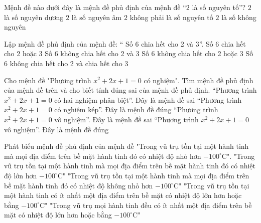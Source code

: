 \begin{ex}%
	Mệnh đề nào dưới đây là mệnh đề phủ định của mệnh đề “$2$ là số nguyên tố”?
	\choice
	{$2$ là số nguyên dương}
	{$2$ là số nguyên âm}
	{\True $2$ không phải là số nguyên tố}
	{$2$ là số không nguyên}
\end{ex}
\begin{ex}%
	Lập mệnh đề phủ định của mệnh đề: “ Số 6 chia hết cho 2 và 3”.
	\choice 
	{ Số 6 chia hết cho 2 hoặc 3} 
	{ Số 6 không chia hết cho 2 và 3} 
	{ \True Số 6 không chia hết cho 2 hoặc 3} 
	{ Số 6 không chia hết cho 2 và chia hết cho 3} 
\end{ex}
\begin{ex}%
	Cho mệnh đề "Phương trình  $x^2+2x+1=0$ có nghiệm". Tìm mệnh đề phủ định của mệnh đề trên và cho biết tính đúng sai của mệnh đề phủ định.
	\choice 
	{``Phương trình $x^2+2x+1=0$ có hai nghiệm phân biệt''. Đây là mệnh đề sai}
	{``Phương trình $x^2+2x+1=0$ có nghiệm kép''. Đây là mệnh đề đúng}
	{\True ``Phương trình $x^2+2x+1=0$ vô nghiệm''. Đây là mệnh đề sai}
	{``Phương trình $x^2+2x+1=0$ vô nghiệm''. Đây là mệnh đề đúng}
\end{ex}
\begin{ex}%
	Phát biểu mệnh đề phủ định của mệnh đề "Trong vũ trụ tồn tại một hành tinh mà mọi địa điểm trên bề mặt hành tinh đó có nhiệt độ nhỏ hơn $-100^\circ $C".
	\choice 
	{"Trong vũ trụ tồn tại một hành tinh mà mọi địa điểm trên bề mặt hành tinh đó có nhiệt độ lớn hơn $-100^\circ $C"}
	{"Trong vũ trụ tồn tại một hành tinh mà mọi địa điểm trên bề mặt hành tinh đó có nhiệt độ không nhỏ hơn $-100^\circ $C"}
	{"Trong vũ trụ tồn tại một hành tinh có ít nhất một địa điểm trên bề mặt có nhiệt độ lớn hơn hoặc bằng $-100^\circ $C"}
	{\True "Trong vũ trụ mọi hành tinh đều có ít nhất một địa điểm trên bề mặt có nhiệt độ lớn hơn hoặc bằng $-100^\circ $C"}
\end{ex}

